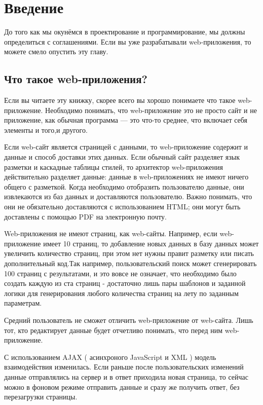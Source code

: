 \chapter{ Введение } \label{chapt1}

До того как мы окунёмся в проектирование и программирование, мы должны определиться с соглашениями. Если вы уже разрабатывали web-приложения, то можете смело опустить эту главу.

\section{ Что такое web-приложения?} \label{sect1_1}


Если вы читаете эту книжку, скорее всего вы хорошо понимаете что такое web-приложение. Необходимо понимать, что web-приложение это не просто сайт и не приложение, как обычная программа --- это что-то среднее, что включает себя элементы и того,и другого.

Если web-сайт является страницей с данными, то web-приложение содержит и данные и способ доставки этих данных. Если обычный сайт разделяет язык разметки и каскадные таблицы стилей, то архитектор web-приложения действительно разделяет данные: данные в web-приложениях не имеют ничего общего с разметкой. Когда необходимо отобразить пользователю данные, они извлекаются из баз данных и доставляются пользователю. Важно понимать, что они не обязательно доставляются с использованием HTML;  они могут быть доставлены с помощью PDF на электронную почту.

Web-приложения не имеют страниц, как web-сайты. Например, если web-приложение имеет 10 страниц, то добавление новых данных в базу данных может увеличить количество страниц, при этом нет нужны правит разметку или писать дополнительный код.Так например, пользовательский поиск может сгенерировать 100 страниц с результатами, и это вовсе не означает, что необходимо было создать каждую из ста страниц - достаточно лишь пары шаблонов и заданной логики для генерирования любого количества страниц на лету по заданным параметрам.

Средний пользователь не сможет отличить web-приложение от web-сайта. Лишь тот, кто редактирует данные будет отчетливо понимать, что перед ним web-приложение.

С использованием AJAX ( асинхроного JavaScript и XML ) модель взаимодействия изменилась. Если раньше после пользовательских изменений данные отправлялись на сервер и в ответ приходила новая страница, то сейчас можно в фоновом режиме отправить данные и сразу же получить ответ, без перезагрузки страницы.

